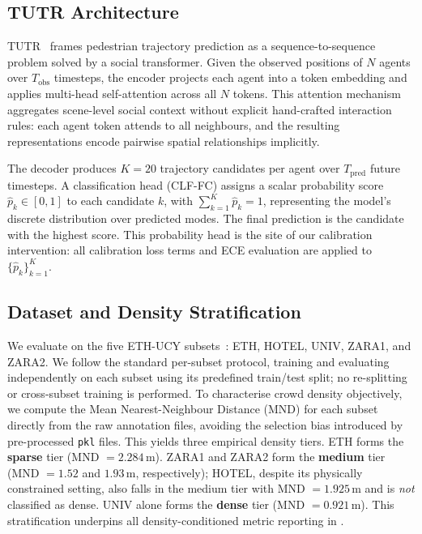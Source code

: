 \documentclass{article}
\begin{document}
\subsection{TUTR Architecture}
\label{sec:prelim:tutr}

TUTR~\cite{shi2023tutr} frames pedestrian trajectory prediction as a
sequence-to-sequence problem solved by a social transformer.
Given the observed positions of \(N\) agents over \(T_\text{obs}\)
timesteps, the encoder projects each agent into a token embedding and
applies multi-head self-attention across all \(N\) tokens.
This attention mechanism aggregates scene-level social context
without explicit hand-crafted interaction rules: each agent token
attends to all neighbours, and the resulting representations encode
pairwise spatial relationships implicitly.

The decoder produces \(K=20\) trajectory candidates per agent over
\(T_\text{pred}\) future timesteps.
A classification head (CLF-FC) assigns a scalar probability score
\(\hat{p}_k \in [0,1]\) to each candidate \(k\), with
\(\sum_{k=1}^{K} \hat{p}_k = 1\), representing the model's
discrete distribution over predicted modes.
The final prediction is the candidate with the highest score.
This probability head is the site of our calibration intervention:
all calibration loss terms and ECE evaluation are applied to
\(\{\hat{p}_k\}_{k=1}^{K}\).

\subsection{Dataset and Density Stratification}
\label{sec:prelim:dataset}

We evaluate on the five ETH-UCY subsets~\cite{pellegrini2009eth,lerner2007ucy}:
ETH, HOTEL, UNIV, ZARA1, and ZARA2.
We follow the standard per-subset protocol, training and evaluating
independently on each subset using its predefined train/test split;
no re-splitting or cross-subset training is performed.
To characterise crowd density objectively, we compute the Mean
Nearest-Neighbour Distance (MND) for each subset directly from the
raw annotation files, avoiding the selection bias introduced by
pre-processed \texttt{pkl} files.
This yields three empirical density tiers.
ETH forms the \textbf{sparse} tier (MND \(= 2.284\,\text{m}\)).
ZARA1 and ZARA2 form the \textbf{medium} tier
(MND \(= 1.52\) and \(1.93\,\text{m}\), respectively);
HOTEL, despite its physically constrained setting, also falls in
the medium tier with MND \(= 1.925\,\text{m}\) and is
\emph{not} classified as dense.
UNIV alone forms the \textbf{dense} tier (MND \(= 0.921\,\text{m}\)).
This stratification underpins all density-conditioned metric
reporting in .
\end{document}
